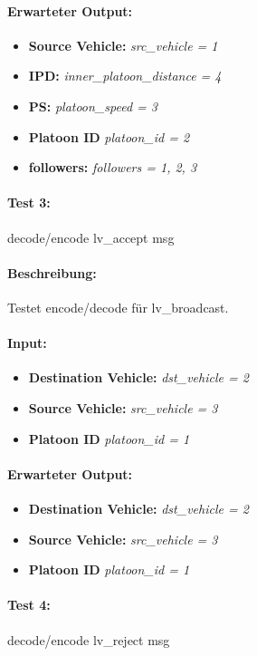 \documentclass[a4paper, 12pt, titlepage]{scrartcl}
\begin{document}
{			\paragraph{Erwarteter Output:}
			\begin{itemize} \itemsep-0.5em
				\item \textbf{Source Vehicle:} \emph{src\_vehicle = 1}
				\item \textbf{IPD:} \emph{inner\_platoon\_distance = 4}
				\item \textbf{PS:} \emph{platoon\_speed = 3}
				\item \textbf{Platoon ID} \emph{platoon\_id = 2}
				\item \textbf{followers:} \emph{followers = {1, 2, 3}}
			\end{itemize}

			\paragraph{Test 3:}{decode/encode lv\_accept msg}
			\paragraph{Beschreibung:} Testet encode/decode für lv\_broadcast.
			\paragraph{Input:}
			\begin{itemize} \itemsep-0.5em
				\item \textbf{Destination Vehicle:} \emph{dst\_vehicle = 2}
				\item \textbf{Source Vehicle:} \emph{src\_vehicle = 3}
				\item \textbf{Platoon ID} \emph{platoon\_id = 1}
			\end{itemize}
			\paragraph{Erwarteter Output:}
			\begin{itemize} \itemsep-0.5em
				\item \textbf{Destination Vehicle:} \emph{dst\_vehicle = 2}
				\item \textbf{Source Vehicle:} \emph{src\_vehicle = 3}
				\item \textbf{Platoon ID} \emph{platoon\_id = 1}
			\end{itemize}
			
			\paragraph{Test 4:}{decode/encode lv\_reject msg}
}
\end{document}
